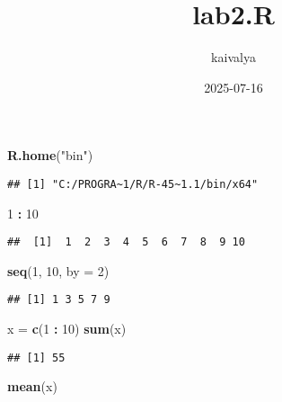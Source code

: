 \documentclass[
]{article}
\title{lab2.R}
\author{kaivalya}
\date{2025-07-16}
\newenvironment{Shaded}{\begin{snugshade}}{\end{snugshade}}
\newcommand{\AttributeTok}[1]{\textcolor[rgb]{0.13,0.29,0.53}{#1}}
\newcommand{\DecValTok}[1]{\textcolor[rgb]{0.00,0.00,0.81}{#1}}
\newcommand{\FunctionTok}[1]{\textcolor[rgb]{0.13,0.29,0.53}{\textbf{#1}}}
\newcommand{\NormalTok}[1]{#1}
\newcommand{\OtherTok}[1]{\textcolor[rgb]{0.56,0.35,0.01}{#1}}
\newcommand{\SpecialCharTok}[1]{\textcolor[rgb]{0.81,0.36,0.00}{\textbf{#1}}}
\newcommand{\StringTok}[1]{\textcolor[rgb]{0.31,0.60,0.02}{#1}}
\begin{document}
\maketitle

\begin{Shaded}
\begin{Highlighting}[]
\FunctionTok{R.home}\NormalTok{(}\StringTok{"bin"}\NormalTok{)}
\end{Highlighting}
\end{Shaded}

\begin{verbatim}
## [1] "C:/PROGRA~1/R/R-45~1.1/bin/x64"
\end{verbatim}

\begin{Shaded}
\begin{Highlighting}[]
\DecValTok{1} \SpecialCharTok{:} \DecValTok{10}
\end{Highlighting}
\end{Shaded}

\begin{verbatim}
##  [1]  1  2  3  4  5  6  7  8  9 10
\end{verbatim}

\begin{Shaded}
\begin{Highlighting}[]
\FunctionTok{seq}\NormalTok{(}\DecValTok{1}\NormalTok{, }\DecValTok{10}\NormalTok{, }\AttributeTok{by =} \DecValTok{2}\NormalTok{)}
\end{Highlighting}
\end{Shaded}

\begin{verbatim}
## [1] 1 3 5 7 9
\end{verbatim}

\begin{Shaded}
\begin{Highlighting}[]
\NormalTok{x }\OtherTok{=} \FunctionTok{c}\NormalTok{(}\DecValTok{1} \SpecialCharTok{:} \DecValTok{10}\NormalTok{)}
\FunctionTok{sum}\NormalTok{(x)}
\end{Highlighting}
\end{Shaded}

\begin{verbatim}
## [1] 55
\end{verbatim}

\begin{Shaded}
\begin{Highlighting}[]
\FunctionTok{mean}\NormalTok{(x)}
\end{Highlighting}
\end{Shaded}
\end{document}
